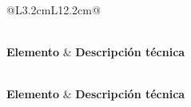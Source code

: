 \begingroup
\footnotesize
\begin{longtable}{@{}L{3.2cm}L{12.2cm}@{}}
  \caption{Especificación de los casos de uso principales del sistema.} \label{tab:especificacion_cu} \\
  \toprule
  \textbf{Elemento} & \textbf{Descripción técnica} \\
  \midrule
  \endfirsthead

   \\[0.5em]
  \toprule
  \textbf{Elemento} & \textbf{Descripción técnica} \\
  \midrule
  \endhead

  \midrule
   \\
  \bottomrule
  \endfoot

  \bottomrule
  \endlastfoot


\end{longtable}
